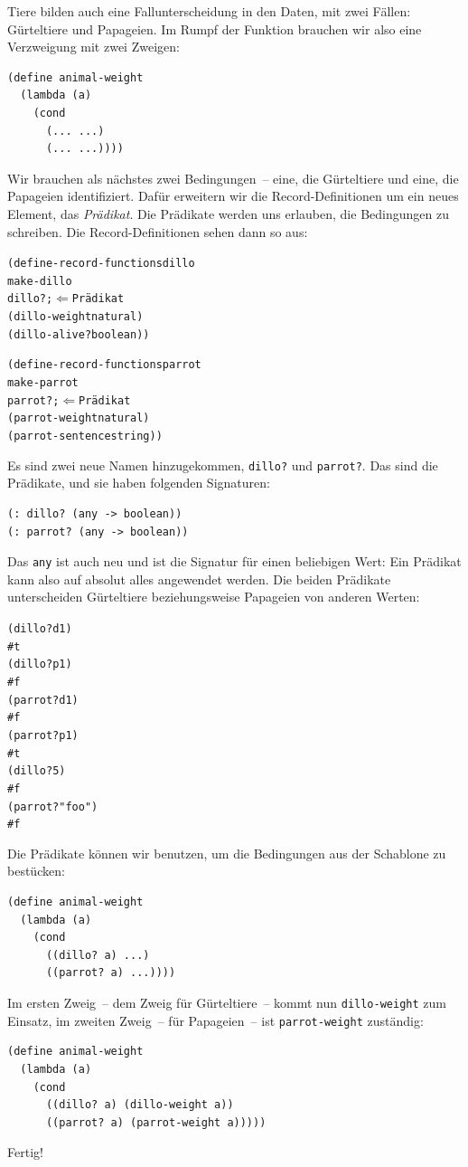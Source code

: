 %
Tiere bilden auch eine Fallunterscheidung in den Daten, mit zwei
Fällen: Gürteltiere und Papageien.  Im Rumpf der Funktion brauchen wir
also eine Verzweigung mit zwei Zweigen:
%
\begin{verbatim}
(define animal-weight
  (lambda (a)
    (cond
      (... ...)
      (... ...))))
\end{verbatim}
%
Wir brauchen als nächstes zwei Bedingungen~-- eine, die Gürteltiere
und eine, die Papageien identifiziert.  Dafür erweitern wir die
Record-Definitionen um ein neues Element, das \textit{Prädikat}.
Die Prädikate werden uns erlauben, die Bedingungen zu
schreiben.  Die Record-Definitionen sehen dann so aus:
%
\begin{alltt}
(define-record-functions dillo
  make-dillo
  dillo? ; \(\Longleftarrow\) Prädikat
  (dillo-weight natural)
  (dillo-alive? boolean))

(define-record-functions parrot
  make-parrot
  parrot? ; \(\Longleftarrow\) Prädikat
  (parrot-weight   natural)
  (parrot-sentence string))
\end{alltt}
%
Es sind zwei neue Namen hinzugekommen, \texttt{dillo?} und
\texttt{parrot?}. Das sind die Prädikate, und sie haben folgenden
Signaturen:
%
\begin{verbatim}
(: dillo? (any -> boolean))
(: parrot? (any -> boolean))
\end{verbatim}
%
Das \texttt{any} ist auch neu und ist die Signatur für einen
beliebigen Wert: Ein Prädikat kann also auf absolut alles angewendet
werden.  Die beiden Prädikate unterscheiden Gürteltiere
beziehungsweise Papageien von anderen Werten:
%
\begin{alltt}
(dillo? d1)
\evalsto #t
(dillo? p1)
\evalsto #f
(parrot? d1)
\evalsto #f
(parrot? p1)
\evalsto #t
(dillo? 5)
\evalsto #f
(parrot? "foo")
\evalsto #f
\end{alltt}
%
Die Prädikate können wir benutzen, um die Bedingungen aus der
Schablone zu bestücken:
%
\begin{verbatim}
(define animal-weight
  (lambda (a)
    (cond
      ((dillo? a) ...)
      ((parrot? a) ...))))
\end{verbatim}
%
Im ersten Zweig~-- dem Zweig für Gürteltiere~-- kommt nun
\texttt{dillo-weight} zum Einsatz, im zweiten Zweig~-- für
Papageien~-- ist \texttt{parrot-weight} zuständig:
%
\begin{verbatim}
(define animal-weight
  (lambda (a)
    (cond
      ((dillo? a) (dillo-weight a))
      ((parrot? a) (parrot-weight a)))))
\end{verbatim}
% 
Fertig!

